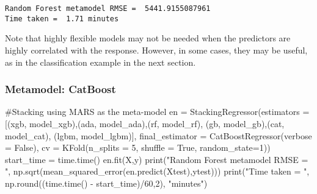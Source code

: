 \documentclass[
  letterpaper,
  DIV=11,
  numbers=noendperiod]{scrreprt}
\newenvironment{Shaded}{\begin{snugshade}}{\end{snugshade}}
\newcommand{\BuiltInTok}[1]{\textcolor[rgb]{0.00,0.23,0.31}{#1}}
\newcommand{\CommentTok}[1]{\textcolor[rgb]{0.37,0.37,0.37}{#1}}
\newcommand{\DecValTok}[1]{\textcolor[rgb]{0.68,0.00,0.00}{#1}}
\newcommand{\NormalTok}[1]{\textcolor[rgb]{0.00,0.23,0.31}{#1}}
\newcommand{\OperatorTok}[1]{\textcolor[rgb]{0.37,0.37,0.37}{#1}}
\newcommand{\StringTok}[1]{\textcolor[rgb]{0.13,0.47,0.30}{#1}}
\newcommand{\VariableTok}[1]{\textcolor[rgb]{0.07,0.07,0.07}{#1}}
\begin{document}
\begin{verbatim}
Random Forest metamodel RMSE =  5441.9155087961
Time taken =  1.71 minutes
\end{verbatim}

Note that highly flexible models may not be needed when the predictors
are highly correlated with the response. However, in some cases, they
may be useful, as in the classification example in the next section.

\subsubsection{Metamodel: CatBoost}\label{metamodel-catboost}

\begin{Shaded}
\begin{Highlighting}[]
\CommentTok{\#Stacking using MARS as the meta{-}model}
\NormalTok{en }\OperatorTok{=}\NormalTok{ StackingRegressor(estimators }\OperatorTok{=}\NormalTok{ [(}\StringTok{\textquotesingle{}xgb\textquotesingle{}}\NormalTok{, model\_xgb),(}\StringTok{\textquotesingle{}ada\textquotesingle{}}\NormalTok{, model\_ada),(}\StringTok{\textquotesingle{}rf\textquotesingle{}}\NormalTok{, model\_rf),}
\NormalTok{                        (}\StringTok{\textquotesingle{}gb\textquotesingle{}}\NormalTok{, model\_gb),(}\StringTok{\textquotesingle{}cat\textquotesingle{}}\NormalTok{, model\_cat), (}\StringTok{\textquotesingle{}lgbm\textquotesingle{}}\NormalTok{, model\_lgbm)],}
\NormalTok{                     final\_estimator }\OperatorTok{=}\NormalTok{ CatBoostRegressor(verbose }\OperatorTok{=} \VariableTok{False}\NormalTok{),                                          }
\NormalTok{                    cv }\OperatorTok{=}\NormalTok{ KFold(n\_splits }\OperatorTok{=} \DecValTok{5}\NormalTok{, shuffle }\OperatorTok{=} \VariableTok{True}\NormalTok{, random\_state}\OperatorTok{=}\DecValTok{1}\NormalTok{))}
\NormalTok{start\_time }\OperatorTok{=}\NormalTok{ time.time()}
\NormalTok{en.fit(X,y)}
\BuiltInTok{print}\NormalTok{(}\StringTok{"Random Forest metamodel RMSE = "}\NormalTok{, np.sqrt(mean\_squared\_error(en.predict(Xtest),ytest)))}
\BuiltInTok{print}\NormalTok{(}\StringTok{"Time taken = "}\NormalTok{, np.}\BuiltInTok{round}\NormalTok{((time.time() }\OperatorTok{{-}}\NormalTok{ start\_time)}\OperatorTok{/}\DecValTok{60}\NormalTok{,}\DecValTok{2}\NormalTok{), }\StringTok{"minutes"}\NormalTok{)}
\end{Highlighting}
\end{Shaded}
\end{document}
